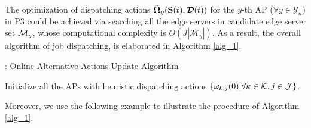 The optimization of dispatching actions $\tilde{\boldsymbol{\Omega}}_{y}(\mathbf{S}(t),\boldsymbol{\mathcal{D}}(t))$ for the $y$-th AP ($\forall y\in\mathcal{Y}_{n}$) in P3 could be achieved via searching all the edge servers in candidate edge server set $\mathcal{M}_{y}$, whose computational complexity is $O(J|\mathcal{M}_{y}|)$.
As a result, the overall algorithm of job dispatching, is elaborated in Algorithm \ref{alg_1}.
\begin{algorithm}[ht]
    \caption{\algname: Online Alternative Actions Update Algorithm}\label{alg_1}
    \DontPrintSemicolon %
    Initialize all the APs with heuristic dispatching actions $\{{\omega}_{k,j}(0)|\forall k\in\mathcal{K},j\in\mathcal{J}\}$.\;
\end{algorithm}
Moreover, we use the following example to illustrate the procedure of Algorithm \ref{alg_1}.
